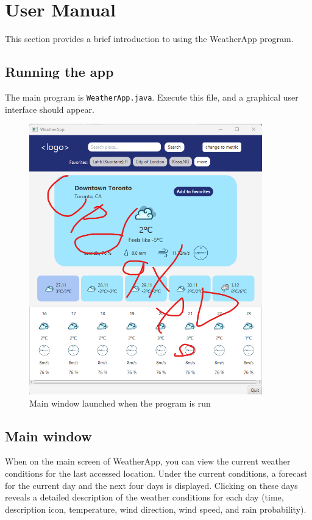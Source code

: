 \documentclass[a4paper,12pt]{article}
\begin{document}
\section{User Manual}

This section provides a brief introduction to using the WeatherApp program.

\subsection{Running the app}

The main program is \texttt{WeatherApp.java}. Execute this file, and a graphical user interface should appear.

\begin{figure}[h]
    \centering
    \includegraphics[width=0.9\textwidth]{weather_app_main_window.png}
    \caption{Main window launched when the program is run}
    \label{fig:main_window}
\end{figure}

\FloatBarrier

\subsection{Main window}

When on the main screen of WeatherApp, you can view the current weather conditions for the last accessed location. Under the current conditions, a forecast for the current day and the next four days is displayed. Clicking on these days reveals a detailed description of the weather conditions for each day (time, description icon, temperature, wind direction, wind speed, and rain probability).
\end{document}
